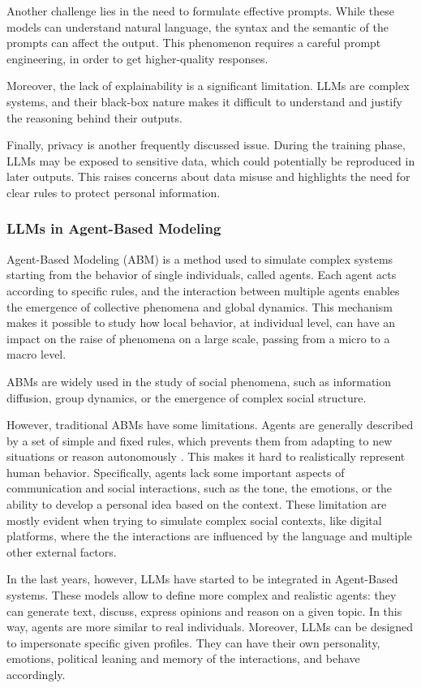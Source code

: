 Another challenge lies in the need to formulate effective prompts. While these models can understand natural language, the syntax and the semantic of the prompts can affect the output. This phenomenon requires a careful prompt engineering, in order to get higher-quality responses.

Moreover, the lack of explainability is a significant limitation. LLMs are complex systems, and their black-box nature makes it difficult to understand and justify the reasoning behind their outputs.

Finally, privacy is another frequently discussed issue. During the training phase, LLMs may be exposed to sensitive data, which could potentially be reproduced in later outputs. This raises concerns about data misuse and highlights the need for clear rules to protect personal information.


\subsubsection{LLMs in Agent-Based Modeling}
Agent-Based Modeling (ABM) is a method used to simulate complex systems starting from the behavior of single individuals, called agents.
Each agent acts according to specific rules, and the interaction between multiple agents enables the emergence of collective phenomena and global dynamics.
This mechanism makes it possible to study how local behavior, at individual level, can have an impact on the raise of phenomena on a large scale, passing from a micro to a macro level.

ABMs are widely used in the study of social phenomena, such as information diffusion, group dynamics, or the emergence of complex social structure.

\medskip
However, traditional ABMs have some limitations.
Agents are generally described by a set of simple and fixed rules, which prevents them from adapting to new situations or reason autonomously \cite{conte2014agent, törnberg2023evaluate}.
This makes it hard to realistically represent human behavior. Specifically, agents lack some important aspects of communication and social interactions, such as the tone, the emotions, or the ability to develop a personal idea based on the context.
These limitation are mostly evident when trying to simulate complex social contexts, like digital platforms, where the the interactions are influenced by the language and multiple other external factors.

\medskip
In the last years, however, LLMs have started to be integrated in Agent-Based systems.
These models allow to define more complex and realistic agents: they can generate text, discuss, express opinions and reason on a given topic. 
In this way, agents are more similar to real individuals.
Moreover, LLMs can be designed to impersonate specific given profiles. They can have their own personality, emotions, political leaning and memory of the interactions, and behave accordingly.

